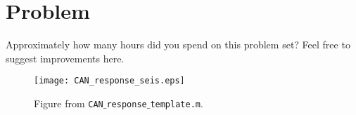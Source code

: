 \documentclass[11pt,titlepage,fleqn]{article}
\newcommand{\tfile}{{\tt lab$\_$response.m}}
\begin{document}

\section*{Problem}

Approximately how many hours did you spend on this problem set? Feel free to suggest improvements here.

\pagebreak




%

\begin{figure}
\hspace{-1cm}
\texttt{[image: CAN\_response\_seis.eps]}
\caption[]
{{
Figure from {\tt CAN$\_$response$\_$template.m}.
}}
\label{fig:seis}
\end{figure}

\end{document}
